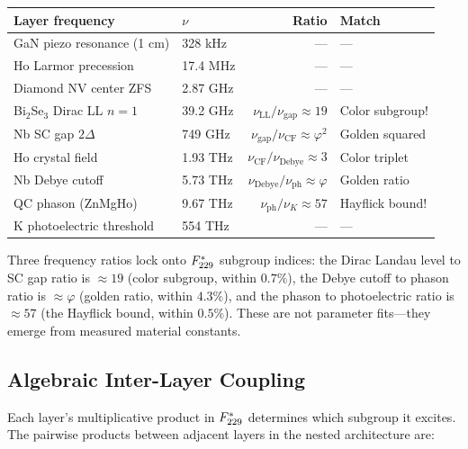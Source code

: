 \begin{center}
\begin{tabular}{@{}llrl@{}}
\toprule
\textbf{Layer frequency} & \textbf{$\nu$} & \textbf{Ratio} & \textbf{Match} \\
\midrule
GaN piezo resonance (1 cm) & 328 kHz & --- & --- \\
Ho Larmor precession & 17.4 MHz & --- & --- \\
Diamond NV center ZFS & 2.87 GHz & --- & --- \\
Bi$_2$Se$_3$ Dirac LL $n{=}1$ & 39.2 GHz & $\nu_{\text{LL}}/\nu_{\text{gap}} \approx 19$ & Color subgroup! \\
Nb SC gap $2\Delta$ & 749 GHz & $\nu_{\text{gap}}/\nu_{\text{CF}} \approx \varphi^2$ & Golden squared \\
Ho crystal field & 1.93 THz & $\nu_{\text{CF}}/\nu_{\text{Debye}} \approx 3$ & Color triplet \\
Nb Debye cutoff & 5.73 THz & $\nu_{\text{Debye}}/\nu_{\text{ph}} \approx \varphi$ & Golden ratio \\
QC phason (ZnMgHo) & 9.67 THz & $\nu_{\text{ph}}/\nu_K \approx 57$ & Hayflick bound! \\
K photoelectric threshold & 554 THz & --- & --- \\
\bottomrule
\end{tabular}
\end{center}

\noindent Three frequency ratios lock onto $F_{229}^*$ subgroup indices: the Dirac Landau level to SC gap ratio is $\approx 19$ (color subgroup, within $0.7\%$), the Debye cutoff to phason ratio is $\approx \varphi$ (golden ratio, within $4.3\%$), and the phason to photoelectric ratio is $\approx 57$ (the Hayflick bound, within $0.5\%$). These are not parameter fits---they emerge from measured material constants.

\subsection{Algebraic Inter-Layer Coupling}

Each layer's multiplicative product in $F_{229}^*$ determines which subgroup it excites. The pairwise products between adjacent layers in the nested architecture are:

